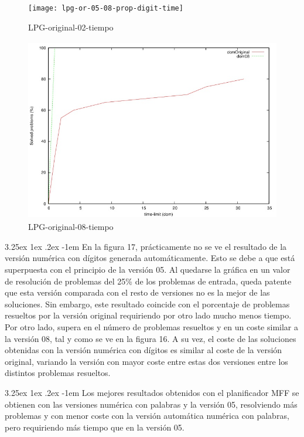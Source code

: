 \documentclass{article}
\makeatletter
\renewcommand\paragraph{\@startsection{paragraph}{5}{\z@}%
      {3.25ex \@plus1ex \@minus.2ex}%
      {-1em}%
      {\normalfont\normalsize\bfseries}}
\makeatother
\begin{document}
    \begin{figure}[H]
        \centering
        \texttt{[image: lpg-or-05-08-prop-digit-time]}
        \caption{LPG-original-02-tiempo}
    \end{figure}
    
    \begin{figure}[H]
        \centering
        \includegraphics[width=12cm, height=8cm]{lpg-or-08-time}
        \caption{LPG-original-08-tiempo}
    \end{figure}
    
    \paragraph{}
    En la figura 17, prácticamente no se ve el resultado de la versión numérica con dígitos generada automáticamente. Esto se debe a que está superpuesta con el principio de la versión 05. Al quedarse la gráfica en un valor de resolución de problemas del 25\% de los problemas de entrada, queda patente que esta versión comparada con el resto de versiones no es la mejor de las soluciones. Sin embargo, este resultado coincide con el porcentaje de problemas resueltos por la versión original requiriendo por otro lado mucho menos tiempo. Por otro lado, supera en el número de problemas resueltos y en un coste similar a la versión 08, tal y como se ve en la figura 16. A su vez, el coste de las soluciones obtenidas con la versión numérica con dígitos es similar al coste de la versión original, variando la versión con mayor coste entre estas dos versiones entre los distintos problemas resueltos.
    
    \paragraph{}
    Los mejores resultados obtenidos con el planificador MFF se obtienen con las versiones numérica con palabras y la versión 05, resolviendo más problemas y con menor coste con la versión automática numérica con palabras, pero requiriendo más tiempo que en la versión 05.
    
\end{document}
